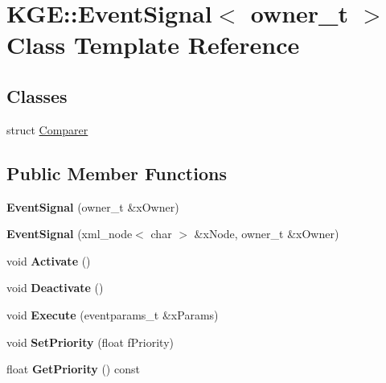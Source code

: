 \hypertarget{class_k_g_e_1_1_event_signal}{\section{K\-G\-E\-:\-:Event\-Signal$<$ owner\-\_\-t $>$ Class Template Reference}
\label{class_k_g_e_1_1_event_signal}
}
\subsection*{Classes}
\begin{DoxyCompactItemize}
\item 
struct \hyperlink{struct_k_g_e_1_1_event_signal_1_1_comparer}{Comparer}
\end{DoxyCompactItemize}
\subsection*{Public Member Functions}
\begin{DoxyCompactItemize}
\item 
\hypertarget{class_k_g_e_1_1_event_signal_a121dfd0a1f2cafd3bc803bbc3e3cacea}{{\bfseries Event\-Signal} (owner\-\_\-t \&x\-Owner)}\label{class_k_g_e_1_1_event_signal_a121dfd0a1f2cafd3bc803bbc3e3cacea}

\item 
\hypertarget{class_k_g_e_1_1_event_signal_a68e673396d68e99a4d0415cccfac5d82}{{\bfseries Event\-Signal} (xml\-\_\-node$<$ char $>$ \&x\-Node, owner\-\_\-t \&x\-Owner)}\label{class_k_g_e_1_1_event_signal_a68e673396d68e99a4d0415cccfac5d82}

\item 
\hypertarget{class_k_g_e_1_1_event_signal_a2f98b89b96d1e784dbd45d3c6dc5328f}{void {\bfseries Activate} ()}\label{class_k_g_e_1_1_event_signal_a2f98b89b96d1e784dbd45d3c6dc5328f}

\item 
\hypertarget{class_k_g_e_1_1_event_signal_a3bd5d17f63a0f2829fb9d6584bf548ce}{void {\bfseries Deactivate} ()}\label{class_k_g_e_1_1_event_signal_a3bd5d17f63a0f2829fb9d6584bf548ce}

\item 
\hypertarget{class_k_g_e_1_1_event_signal_a33ff8d1fc42a054923e763a2e7d3a334}{void {\bfseries Execute} (eventparams\-\_\-t \&x\-Params)}\label{class_k_g_e_1_1_event_signal_a33ff8d1fc42a054923e763a2e7d3a334}

\item 
\hypertarget{class_k_g_e_1_1_event_signal_aa654f733e993ec10a5541d9b61564101}{void {\bfseries Set\-Priority} (float f\-Priority)}\label{class_k_g_e_1_1_event_signal_aa654f733e993ec10a5541d9b61564101}

\item 
\hypertarget{class_k_g_e_1_1_event_signal_a9584569f24029b389e55c5e0feae1cda}{float {\bfseries Get\-Priority} () const }\label{class_k_g_e_1_1_event_signal_a9584569f24029b389e55c5e0feae1cda}

\end{DoxyCompactItemize}
